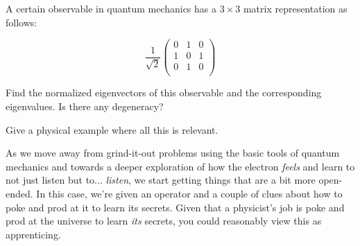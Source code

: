 \begin{question}

A certain observable in quantum mechanics has a $3 \times 3$ matrix
representation as follows:

\begin{equation*}
  \frac{1}{\sqrt{2}}
  \begin{pmatrix}
    0 & 1 & 0\\
    1 & 0 & 1\\
    0 & 1 & 0\\
  \end{pmatrix}
\end{equation*}

\begin{questionpart}
  Find the normalized eigenvectors of this observable and the
  corresponding eigenvalues. Is there any degeneracy?
\end{questionpart}

\begin{questionpart}
 Give a physical example where all this is relevant.  
\end{questionpart}

\end{question}

\begin{purpose}
  As we move away from grind-it-out problems using the basic tools of
  quantum mechanics and towards a deeper exploration of how the
  electron \emph{feels} and learn to not just listen but
  to... \emph{listen}, we start getting things that are a bit more
  open-ended.  In this case, we're given an operator and a couple of
  clues about how to poke and prod at it to learn its secrets.  Given
  that a physicist's job is poke and prod at the universe to learn
  \emph{its} secrets, you could reasonably view this as apprenticing.
\end{purpose}


